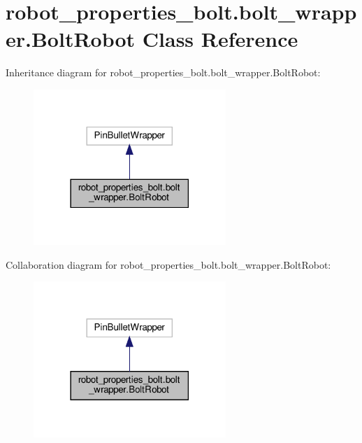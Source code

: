 \hypertarget{classrobot__properties__bolt_1_1bolt__wrapper_1_1BoltRobot}{}\section{robot\+\_\+properties\+\_\+bolt.\+bolt\+\_\+wrapper.\+Bolt\+Robot Class Reference}
\label{classrobot__properties__bolt_1_1bolt__wrapper_1_1BoltRobot}


Inheritance diagram for robot\+\_\+properties\+\_\+bolt.\+bolt\+\_\+wrapper.\+Bolt\+Robot\+:
\nopagebreak
\begin{figure}[H]
\begin{center}
\leavevmode
\includegraphics[width=206pt]{classrobot__properties__bolt_1_1bolt__wrapper_1_1BoltRobot__inherit__graph}
\end{center}
\end{figure}


Collaboration diagram for robot\+\_\+properties\+\_\+bolt.\+bolt\+\_\+wrapper.\+Bolt\+Robot\+:
\nopagebreak
\begin{figure}[H]
\begin{center}
\leavevmode
\includegraphics[width=206pt]{classrobot__properties__bolt_1_1bolt__wrapper_1_1BoltRobot__coll__graph}
\end{center}
\end{figure}
